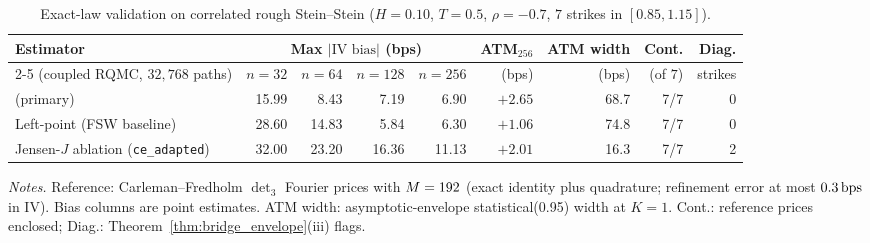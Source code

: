 \begin{table}[t]
\centering
\caption{Exact-law validation on correlated rough Stein--Stein ($H=0.10$, $T=0.5$, $\rho=-0.7$, $7$ strikes in $[0.85,1.15]$).}
\label{tab:e1_rss}
\footnotesize
\setlength{\tabcolsep}{3.4pt}
\begin{tabular}{@{}lrrrrrrrr@{}}
\toprule
Estimator & \multicolumn{4}{c}{Max $|\text{IV bias}|$ (bps)} & ATM$_{256}$ & ATM width & Cont. & Diag. \\
\cmidrule(lr){2-5}
(coupled RQMC, $32{,}768$ paths) & $n{=}32$ & $n{=}64$ & $n{=}128$ & $n{=}256$ & (bps) & (bps) & (of $7$) & strikes \\
\midrule
\RCCE{} (primary) & 15.99 & 8.43 & 7.19 & 6.90 & $+2.65$ & 68.7 & 7/7 & 0 \\
Left-point (FSW baseline) & 28.60 & 14.83 & 5.84 & 6.30 & $+1.06$ & 74.8 & 7/7 & 0 \\
Jensen-$J$ ablation (\texttt{ce\_adapted}) & 32.00 & 23.20 & 16.36 & 11.13 & $+2.01$ & 16.3 & 7/7 & 2 \\
\bottomrule
\end{tabular}
\par\smallskip
\parbox{\linewidth}{\footnotesize\emph{Notes.} Reference: Carleman--Fredholm $\det_3$ Fourier prices with $M=192$ (exact identity plus quadrature; refinement error at most $0.3\,\mathrm{bps}$ in IV). Bias columns are point estimates. ATM width: \RCBridge{} asymptotic-envelope statistical(0.95) width at $K=1$. Cont.: reference prices enclosed; Diag.: Theorem~\ref{thm:bridge_envelope}(iii) flags.}
\end{table}

